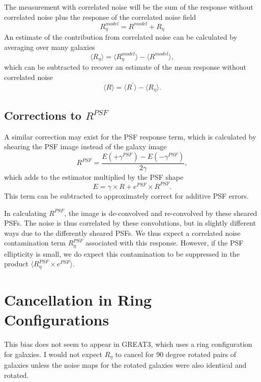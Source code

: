 \documentclass[usegraphicx,usenatbib]{mn2e}
\begin{document}
The measurement with correlated noise will be the sum of the response
without correlated noise plus the response of the correlated noise field
\begin{equation}
    R^{model}_\eta = R^{model} + R_\eta
\end{equation}
An estimate of the contribution from correlated noise can
be calculated by averaging over many galaxies
\begin{equation}
    \langle R_\eta \rangle = \langle R^{model}_\eta \rangle - \langle R^{model} \rangle,
\end{equation}
which can be subtracted to recover an estimate of the mean response without
correlated noise
\begin{equation}
    \langle R \rangle = \langle R^\prime \rangle - \langle R_\eta \rangle.
\end{equation}

\subsection{Corrections to $R^{PSF}$}

A similar correction may exist for the PSF response term, which is
calculated by shearing the PSF image instead of the galaxy image
\begin{equation}
    R^{PSF} = \frac{E(+\gamma^{PSF}) - E(-\gamma^{PSF})}{2 \gamma},
\end{equation}
which adds to the estimator multiplied by the PSF shape
\begin{equation}
    E = \gamma \times R + e^{PSF} \times R^{PSF}.
\end{equation}
This term can be subtracted to approximately correct for additive PSF errors.

In calculating $R^{PSF}$, the image is de-convolved and re-convolved by these
sheared PSFs. The noise is thus correlated by these convolutions, but in
slightly different ways due to the differently sheared PSFs.  We thus expect a
correlated noise contamination term $R^{PSF}_\eta$ associated with this
response.  However, if the PSF ellipticity is small, we do expect this
contamination to be suppressed in the product $\langle R^{PSF}_\eta\times
e^{PSF}\rangle$.

\section{Cancellation in Ring Configurations}

This bias does not seem to appear in GREAT3, which uses a ring configuration
for galaxies.  I would not expect $R_\eta$ to cancel for 90 degree rotated
pairs of galaxies unless the noise maps for the rotated galaxies
were also identical and rotated.




\end{document}
